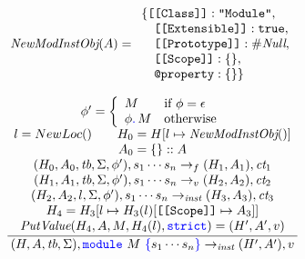 \documentclass[a4paper]{article}
\newcommand{\code}[1]{\textcolor{blue}{\tt #1}}
\newcommand{\mydot}{.\,}
\newcommand{\dom}{\mathop{\mathrm{Dom}}}
\newcommand{\Unprefix}{\emph{Unprefix}}
\newcommand{\NewModInstObj}{\emph{NewModInstObj}}
\newcommand{\If}{\mbox{if}}
\newcommand{\Otherwise}{\mbox{otherwise}}
\newcommand{\tb}{\emph{tb}}
\newcommand{\ct}{\emph{ct}}
\newcommand{\ap}{\emph{ap}}
\begin{document}
\begin{equation*}
\NewModInstObj(A) = \begin{array}{l}
\{ \texttt{[[Class]]}: \texttt{"Module"}, \\
\quad \texttt{[[Extensible]]}: \texttt{true}, \\
\quad \texttt{[[Prototype]]}: \#\emph{Null}, \\
\quad \texttt{[[Scope]]}: \{\}, \\
\quad \texttt{@property}: \{\} \}
\end{array}
\end{equation*}

\begin{equation*}
\frac{
    \begin{array}{c}
    \phi' = \left\{\begin{array}{ll}
        M & \If\ \phi = \epsilon \\
        \phi\code{\mydot}M & \Otherwise
    \end{array}\right. \\
    l = NewLoc() \qquad H_0 = H [l \mapsto \NewModInstObj()] \\
    A_0 = \{\} :: A \\
    (H_0, A_0, \tb, \Sigma, \phi'), s_1 \cdots s_n \rightarrow_f (H_1, A_1), \ct_1 \\
    (H_1, A_1, \tb, \Sigma, \phi'), s_1 \cdots s_n \rightarrow_v (H_2, A_2), \ct_2 \\
    (H_2, A_2, l, \Sigma, \phi'), s_1 \cdots s_n \rightarrow_\emph{inst} (H_3, A_3), \ct_3 \\
    H_4 = H_3[l \mapsto H_3(l)[\texttt{[[Scope]]} \mapsto A_3]] \\
    \emph{PutValue}(H_4, A, M, H_4(l), \code{strict}) = (H', A', v)

    \end{array}
}{
    (H, A, \tb, \Sigma), \code{module}\ M\ \code{\{} s_1 \cdots s_n \code{\}} \rightarrow_\emph{inst} (H', A'), v
}
\end{equation*}
\end{document}
